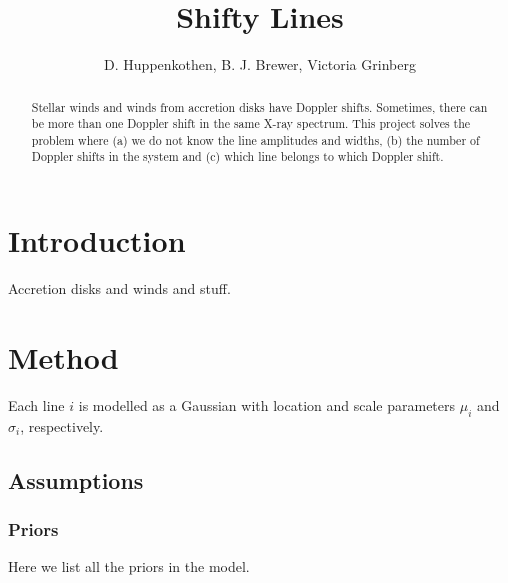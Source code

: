 \documentclass[12pt]{emulateapj}
\begin{document}
\title{Shifty Lines}

\author{D. Huppenkothen, B. J. Brewer, Victoria Grinberg}
 


\begin{abstract}
Stellar winds and winds from accretion disks have Doppler shifts. Sometimes, there can be more than one Doppler shift in 
the same X-ray spectrum. This project solves the problem where (a) we do not know the line amplitudes and widths, (b) the 
number of Doppler shifts in the system and (c) which line belongs to which Doppler shift.

\end{abstract}


\section{Introduction}

Accretion disks and winds and stuff.

\section{Method}

Each line $i$ is modelled as a Gaussian with location and scale parameters $\mu_i$ and $\sigma_i$, respectively.


\subsection{Assumptions}

\subsubsection{Priors}

Here we list all the priors in the model.
\end{document}
